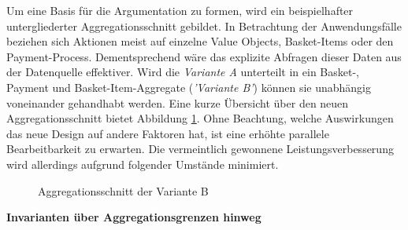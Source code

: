 Um eine Basis für die Argumentation zu formen, wird ein beispielhafter untergliederter Aggregationsschnitt gebildet. In Betrachtung der Anwendungsfälle beziehen sich Aktionen meist auf einzelne Value Objects, Basket-Items oder den Payment-Process. Dementsprechend wäre das explizite Abfragen dieser Daten aus der Datenquelle effektiver. Wird die \emph{Variante A} unterteilt in ein Basket-, Payment und Basket-Item-Aggregate (\emph{'Variante B'}) können sie unabhängig voneinander gehandhabt werden. Eine kurze Übersicht über den neuen Aggregationsschnitt bietet Abbildung \ref{fig:VarB}. Ohne Beachtung, welche Auswirkungen das neue Design auf andere Faktoren hat, ist eine erhöhte parallele Bearbeitbarkeit zu erwarten. Die vermeintlich gewonnene Leistungsverbesserung wird allerdings aufgrund folgender Umstände minimiert.

\begin{figure}[htbp]
	\centering
	
	\caption{Aggregationsschnitt der Variante B}
	\label{fig:VarB}
\end{figure}

\vspace{1em}

\textbf{Invarianten über Aggregationsgrenzen hinweg}

